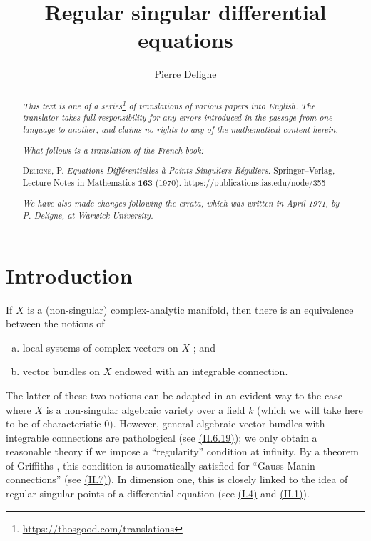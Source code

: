 \documentclass{report}
\title{Regular singular differential equations}
\author{Pierre Deligne}
\date{}
\newcommand{\doctype}{French book}
\newcommand{\origcit}{%
  \textsc{Deligne, P.}
  \emph{Equations Diff\'{e}rentielles \`{a} Points Singuliers R\'{e}guliers.}
  Springer--Verlag, Lecture Notes in Mathematics \textbf{163} (1970).
  {\url{https://publications.ias.edu/node/355}}%
}
\newcommand{\oldpage}[1]{\marginpar{\footnotesize$\Big\vert$ \textit{p.~#1}}}
\begin{document}
\hypersetup{pageanchor=false}
\begin{titlepage}
\maketitle
\end{titlepage}

\renewcommand{\abstractname}{Translator's note.}

\begin{abstract}
  \renewcommand*{\thefootnote}{\fnsymbol{footnote}}
  \emph{This text is one of a series\footnote{\url{https://thosgood.com/translations}} of translations of various papers into English.}
  \emph{The translator takes full responsibility for any errors introduced in the passage from one language to another, and claims no rights to any of the mathematical content herein.}

  \medskip
  
  \emph{What follows is a translation of the \doctype:}

  \medskip\noindent
  \origcit

  \medskip
  \noindent\emph{We have also made changes following the errata, which was written in April 1971, by P. Deligne, at Warwick University.}
\end{abstract}

\hypersetup{pageanchor=true}

\setcounter{footnote}{0}

\tableofcontents



\setcounter{chapter}{-1}

\chapter{Introduction}
\label{0}

\oldpage{1}
If $X$ is a (non-singular) complex-analytic manifold, then there is an equivalence between the notions of
\begin{enumerate}[a)]
  \item local systems of complex vectors on $X$ ; and
  \item vector bundles on $X$ endowed with an integrable connection.
\end{enumerate}

The latter of these two notions can be adapted in an evident way to the case where $X$ is a non-singular algebraic variety over a field $k$ (which we will take here to be of characteristic $0$).
However, general algebraic vector bundles with integrable connections are pathological (see \hyperref[II.6.19]{(II.6.19)});
we only obtain a reasonable theory if we impose a ``regularity'' condition at infinity.
By a theorem of Griffiths \cite{8}, this condition is automatically satisfied for ``Gauss-Manin connections'' (see \hyperref[II.7]{(II.7)}).
In dimension one, this is closely linked to the idea of regular singular points of a differential equation (see \hyperref[I.4]{(I.4)} and \hyperref[II.1]{(II.1)}).
\end{document}
